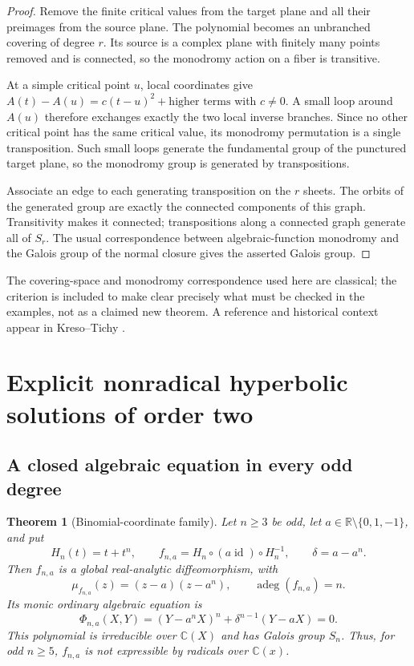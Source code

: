 \documentclass[11pt,letterpaper]{article}
\newtheorem{theorem}{Theorem}[section]
\theoremstyle{definition}
\theoremstyle{remark}
\newcommand{\R}{\mathbb R}
\newcommand{\C}{\mathbb C}
\newcommand{\id}{\operatorname{id}}
\newcommand{\algdeg}{\operatorname{adeg}}
\begin{document}
\begin{proof}
Remove the finite critical values from the target plane and all their preimages
from the source plane. The polynomial becomes an unbranched covering of degree
$r$. Its source is a complex plane with finitely many points removed and is
connected, so the monodromy action on a fiber is transitive.

At a simple critical point $u$, local coordinates give
$A(t)-A(u)=c(t-u)^2+\text{higher terms}$ with $c\ne0$. A small loop around $A(u)$
therefore exchanges exactly the two local inverse branches. Since no other
critical point has the same critical value, its monodromy permutation is a
single transposition. Such small loops generate the fundamental group of the
punctured target plane, so the monodromy group is generated by transpositions.

Associate an edge to each generating transposition on the $r$ sheets. The orbits
of the generated group are exactly the connected components of this graph.
Transitivity makes it connected; transpositions along a connected graph generate
all of $S_r$. The usual correspondence between algebraic-function monodromy and
the Galois group of the normal closure gives the asserted Galois group.
\end{proof}

The covering-space and monodromy correspondence used here are classical; the
criterion is included to make clear precisely what must be checked in the examples,
not as a claimed new theorem. A reference and historical context appear in
Kreso--Tichy \cite{KT2016}.

\section{Explicit nonradical hyperbolic solutions of order two}
\label{nrr:ed:sec:hyperbolic-family}

\subsection{A closed algebraic equation in every odd degree}

\begin{theorem}[Binomial-coordinate family]
\label{nrr:ed:thm:binomial}
Let $n\ge3$ be odd, let $a\in\R\setminus\{0,1,-1\}$, and put
\begin{equation}
 H_n(t)=t+t^n,\qquad f_{n,a}=H_n\circ(a\id)\circ H_n^{-1},\qquad
 \delta=a-a^n.
 \label{nrr:ed:eq:binomial-def}
\end{equation}
Then $f_{n,a}$ is a global real-analytic diffeomorphism, with
\begin{equation}
 \mu_{f_{n,a}}(z)=(z-a)(z-a^n),\qquad \algdeg(f_{n,a})=n.
 \label{nrr:ed:eq:binomial-degrees}
\end{equation}
Its monic ordinary algebraic equation is
\begin{equation}
 \Phi_{n,a}(X,Y)=(Y-a^nX)^n+\delta^{n-1}(Y-aX)=0.
 \label{nrr:ed:eq:binomial-curve}
\end{equation}
This polynomial is irreducible over $\C(X)$ and has Galois group $S_n$. Thus,
for odd $n\ge5$, $f_{n,a}$ is not expressible by radicals over $\C(x)$.
\end{theorem}
\end{document}
